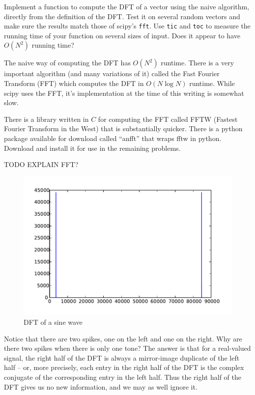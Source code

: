 \begin{problem}
Implement a function to compute the DFT of a vector using the naive algorithm, directly from the definition of the DFT. Test it on several random vectors and make sure the results match those of scipy's \texttt{fft}. Use \texttt{tic} and \texttt{toc} to measure the running time of your function on several sizes of input. Does it appear to have $O(N^2)$ running time?
\end{problem}

The naive way of computing the DFT has $O(N^2)$ runtime.  There is a very important algorithm (and many variations of it) called the Fast Fourier Transform (FFT) which computes the DFT in $O(N \log N)$ runtime.  While scipy uses the FFT, it's implementation at the time of this writing is somewhat slow.  

There is a library written in $C$ for computing the FFT called FFTW (Fastest Fourier Transform in the West) that is substantially quicker.  There is a python package available for download called ``anfft'' that wraps fftw in python.  Download and install it for use in the remaining problems.

TODO EXPLAIN FFT?


\begin{figure}[ht]\caption{DFT of a sine wave}\label{sinespec}\centering\includegraphics[width=\textwidth]{sinespec}\end{figure}
Notice that there are two spikes, one on the left and one on the right. Why are there two spikes when there is only one tone? The answer is that for a real-valued signal, the right half of the DFT is always a mirror-image duplicate of the left half -- or, more precisely, each entry in the right half of the DFT is the complex conjugate of the corresponding entry in the left half. Thus the right half of the DFT gives us no new information, and we may as well ignore it.

